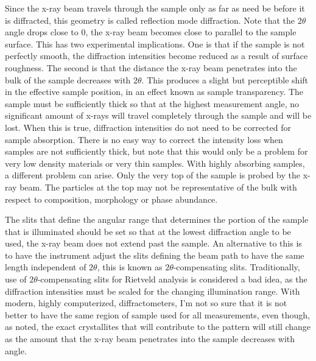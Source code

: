Since the x-ray beam travels through the sample only as far as need be before it is diffracted, this geometry is called reflection mode diffraction. 
Note that the $2\theta$ angle drops close to 0, the x-ray beam becomes close to parallel to the sample surface. This has two experimental implications. 
One is that if the sample is not perfectly smooth, the diffraction intensities become reduced as a result of surface roughness. 
The second is that the distance the x-ray beam penetrates into the bulk of the sample decreases with $2\theta$. This produces a slight but perceptible shift in the effective sample position, in an effect known as sample transparency\label{sample transparency}. 
The sample must be sufficiently thick so that at the highest measurement angle, no significant amount of x-rays will travel completely through the sample and will be lost. 
When this is true, diffraction intensities do not need to be corrected for sample absorption.  
There is no easy way to correct the intensity loss when samples are not sufficiently thick, but note that this would only be a problem for very low density materials or very thin samples. With highly absorbing samples, a different problem can arise. Only the very top of the sample is probed by the x-ray beam. The particles at the top may not be representative of the bulk with respect to composition, morphology or phase abundance. 

The slits that define the angular range that determines the portion of the sample that is illuminated should be set so that at the lowest diffraction angle to be used, the x-ray beam does not extend past the sample. 
An alternative to this is to have the instrument adjust the slits defining the beam path to have the same length independent of $2\theta$, this is known as $2\theta$-compensating slits. 
Traditionally, use of  $2\theta$-compensating slits for Rietveld analysis is considered a bad idea, as the diffraction intensities must be scaled for the changing illumination range. 
With modern, highly computerized, diffractometers, I'm not so sure that it is not better to have the same region of sample used for all measurements, even though, as noted, the exact crystallites that will contribute to the pattern will still change as the amount that the x-ray beam penetrates into the sample decreases with angle. 

